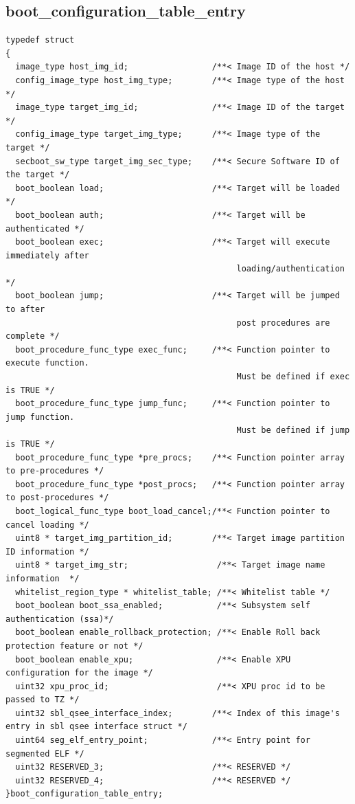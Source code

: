 \subsection{boot\_configuration\_table\_entry \label{sbl1_config_table}}
\begin{lstlisting}
typedef struct
{
  image_type host_img_id;                 /**< Image ID of the host */
  config_image_type host_img_type;        /**< Image type of the host */ 
  image_type target_img_id;               /**< Image ID of the target */ 
  config_image_type target_img_type;      /**< Image type of the target */ 
  secboot_sw_type target_img_sec_type;    /**< Secure Software ID of the target */
  boot_boolean load;                      /**< Target will be loaded */
  boot_boolean auth;                      /**< Target will be authenticated */
  boot_boolean exec;                      /**< Target will execute immediately after
                                               loading/authentication */
  boot_boolean jump;                      /**< Target will be jumped to after
                                               post procedures are complete */ 
  boot_procedure_func_type exec_func;     /**< Function pointer to execute function.
                                               Must be defined if exec is TRUE */ 
  boot_procedure_func_type jump_func;     /**< Function pointer to jump function.
                                               Must be defined if jump is TRUE */ 
  boot_procedure_func_type *pre_procs;    /**< Function pointer array to pre-procedures */
  boot_procedure_func_type *post_procs;   /**< Function pointer array to post-procedures */
  boot_logical_func_type boot_load_cancel;/**< Function pointer to cancel loading */ 
  uint8 * target_img_partition_id;        /**< Target image partition ID information */
  uint8 * target_img_str;                  /**< Target image name information  */
  whitelist_region_type * whitelist_table; /**< Whitelist table */
  boot_boolean boot_ssa_enabled;           /**< Subsystem self authentication (ssa)*/
  boot_boolean enable_rollback_protection; /**< Enable Roll back protection feature or not */
  boot_boolean enable_xpu;                 /**< Enable XPU configuration for the image */
  uint32 xpu_proc_id;                      /**< XPU proc id to be passed to TZ */
  uint32 sbl_qsee_interface_index;        /**< Index of this image's entry in sbl qsee interface struct */
  uint64 seg_elf_entry_point;             /**< Entry point for segmented ELF */
  uint32 RESERVED_3;                      /**< RESERVED */
  uint32 RESERVED_4;                      /**< RESERVED */
}boot_configuration_table_entry;





\end{lstlisting}
